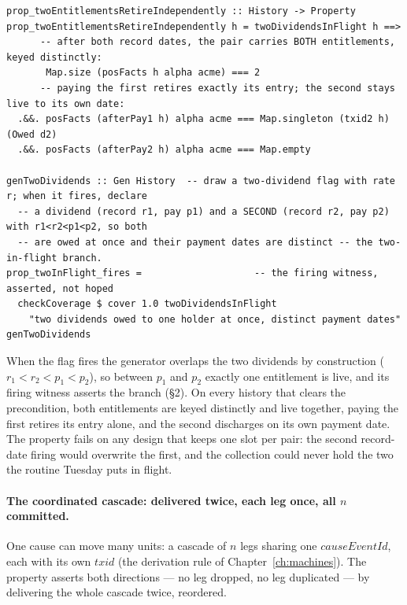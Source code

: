 \documentclass[11pt,a4paper]{article}
\begin{document}
\begin{lstlisting}
prop_twoEntitlementsRetireIndependently :: History -> Property
prop_twoEntitlementsRetireIndependently h = twoDividendsInFlight h ==>
      -- after both record dates, the pair carries BOTH entitlements, keyed distinctly:
       Map.size (posFacts h alpha acme) === 2
      -- paying the first retires exactly its entry; the second stays live to its own date:
  .&&. posFacts (afterPay1 h) alpha acme === Map.singleton (txid2 h) (Owed d2)
  .&&. posFacts (afterPay2 h) alpha acme === Map.empty

genTwoDividends :: Gen History  -- draw a two-dividend flag with rate r; when it fires, declare
  -- a dividend (record r1, pay p1) and a SECOND (record r2, pay p2) with r1<r2<p1<p2, so both
  -- are owed at once and their payment dates are distinct -- the two-in-flight branch.
prop_twoInFlight_fires =                    -- the firing witness, asserted, not hoped
  checkCoverage $ cover 1.0 twoDividendsInFlight
    "two dividends owed to one holder at once, distinct payment dates" genTwoDividends
\end{lstlisting}

When the flag fires the generator overlaps the two dividends by construction ($r_1<r_2<p_1<p_2$),
so between $p_1$ and $p_2$ exactly one entitlement is live, and its firing witness asserts the
branch (\S 2). On every history that clears the precondition, both
entitlements are keyed distinctly and live together, paying the first retires its entry alone,
and the second discharges on its own payment date. The property fails on any design that keeps
one slot per pair: the second record-date firing would overwrite the first, and the collection
could never hold the two the routine Tuesday puts in flight.

\paragraph{The coordinated cascade: delivered twice, each leg once, all $n$ committed.}
One cause can move many units: a cascade of $n$ legs sharing one $\mathit{causeEventId}$,
each with its own $\mathit{txid}$ (the derivation rule of Chapter~\ref{ch:machines}).
The property asserts both directions --- no leg dropped, no leg duplicated --- by
delivering the whole cascade twice, reordered.
\end{document}
